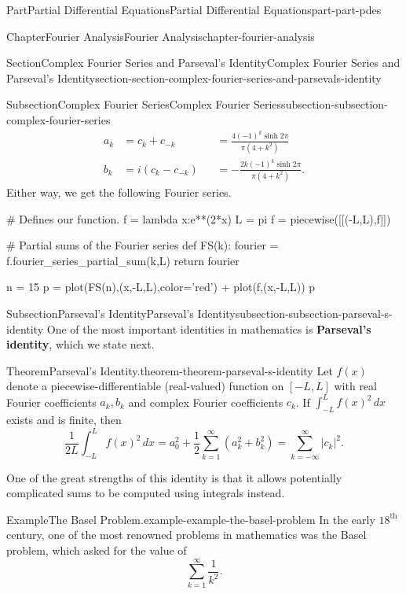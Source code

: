 \documentclass[twoside,10pt,]{book}
\newcommand{\terminology}[1]{\textbf{#1}}
\numberwithin{equation}{part}
\newcommand{\amp}{&}
\begin{document}
\begin{partptx}{Part}{Partial Differential Equations}{}{Partial Differential Equations}{}{}{part-part-pdes}
\begin{chapterptx}{Chapter}{Fourier Analysis}{}{Fourier Analysis}{}{}{chapter-fourier-analysis}
\begin{sectionptx}{Section}{Complex Fourier Series and Parseval's Identity}{}{Complex Fourier Series and Parseval's Identity}{}{}{section-section-complex-fourier-series-and-parsevals-identity}
\begin{subsectionptx}{Subsection}{Complex Fourier Series}{}{Complex Fourier Series}{}{}{subsection-subsection-complex-fourier-series}
\begin{align*}
a_{k} \amp = c_{k} + c_{-k} \amp \amp= \frac{4(-1)^{k}\sinh2\pi}{\pi(4+k^{2})} \\
b_{k} \amp = i(c_{k}-c_{-k}) \amp \amp= -\frac{2k(-1)^{k}\sinh2\pi}{\pi(4+k^{2})}. 
\end{align*}
Either way, we get the following Fourier series.%
\begin{sageinput}
# Defines our function.
f = lambda x:e**(2*x)
L = pi
f = piecewise([[(-L,L),f]])

# Partial sums of the Fourier series
def FS(k):
  fourier = f.fourier_series_partial_sum(k,L)
  return fourier

n = 15
p = plot(FS(n),(x,-L,L),color='red') + plot(f,(x,-L,L))
p
\end{sageinput}
\end{subsectionptx}
%
%
\typeout{************************************************}
\typeout{************************************************}
%
\begin{subsectionptx}{Subsection}{Parseval's Identity}{}{Parseval's Identity}{}{}{subsection-subsection-parseval-s-identity}
One of the most important identities in mathematics is \terminology{Parseval's identity}, which we state next.%
\begin{theorem}{Theorem}{Parseval's Identity.}{}{theorem-theorem-parseval-s-identity}%
%
Let \(f(x)\) denote a piecewise-differentiable (real-valued) function on \([-L,L]\) with real Fourier coefficients \(a_{k},b_{k}\) and complex Fourier coefficients \(c_{k}\). If \(\int_{-L}^{L}f(x)^{2}\,dx\) exists and is finite, then%
\begin{equation*}
\frac{1}{2L}\int_{-L}^{L}f(x)^{2}\,dx = a^{2}_{0} + \frac{1}{2}\sum_{k=1}^{\infty}(a^{2}_{k}+b^{2}_{k}) = \sum_{k=-\infty}^{\infty}|c_{k}|^{2}.
\end{equation*}
%
\end{theorem}
One of the great strengths of this identity is that it allows potentially complicated sums to be computed using integrals instead.%
\begin{example}{Example}{The Basel Problem.}{example-example-the-basel-problem}%
%
In the early \(18^{\text{th}}\) century, one of the most renowned problems in mathematics was the Basel problem, which asked for the value of%
\begin{equation*}
\sum_{k=1}^{\infty}\frac{1}{k^{2}}.
\end{equation*}

\end{example}
\end{subsectionptx}
\end{sectionptx}
\end{chapterptx}
\end{partptx}
\end{document}
